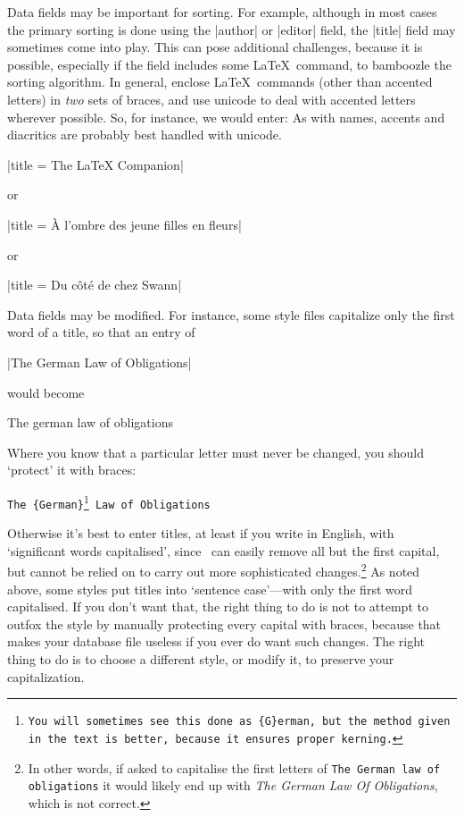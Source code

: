 {Data fields may be important for sorting. For example, although in
most cases the primary sorting is done using the |author| or |editor|
field, the |title| field may sometimes come into play. This can pose
additional challenges, because it is possible, especially if the field
includes some \LaTeX\ command, to bamboozle the sorting algorithm. In
general, enclose \LaTeX\ commands (other than accented letters) in
\emph{two} sets of braces, and use unicode to deal with accented
letters wherever possible. So, for instance, we would
enter: As with names,
accents and diacritics are probably best handled with unicode.
\begin{center}
|title = {The {{\LaTeX}} Companion}|

or

|title = {{\`A} l'ombre des jeune filles en fleurs}|

or

|title = {Du côté de chez Swann}|
\end{center}

Data fields may be modified. For instance, some style files capitalize
only the first word of a title, so that an entry of
\begin{center}
|The German Law of Obligations|
\end{center}
would become
\begin{center}
The german law of obligations
\end{center}
Where you know that a particular letter must never be changed, you should `protect' it with braces:
\begin{center}
\texttt{The \{German\}\footnote{You will sometimes see this done as \texttt{\{G\}erman}, but the method given in the text is better, because it ensures proper kerning.} Law of Obligations}
\end{center}
Otherwise it's best to enter titles, at least if you write in English,
with `significant words capitalised', since \biblatex\ can easily
remove all but the first capital, but cannot be relied on to carry out
more sophisticated changes.\footnote{In other words, if asked to
  capitalise the first letters of \texttt{The German law of
    obligations} it would likely end up with \emph{The German Law Of
    Obligations}, which is not correct.} As noted above, some styles
put titles into `sentence case'---with only the first word
capitalised. If you don't want that, the right thing to do is not to
attempt to outfox the style by manually protecting every capital with
braces, because that makes your database file useless if you ever do
want such changes. The right thing to do is to choose a different
style, or modify it, to preserve your capitalization.

}
